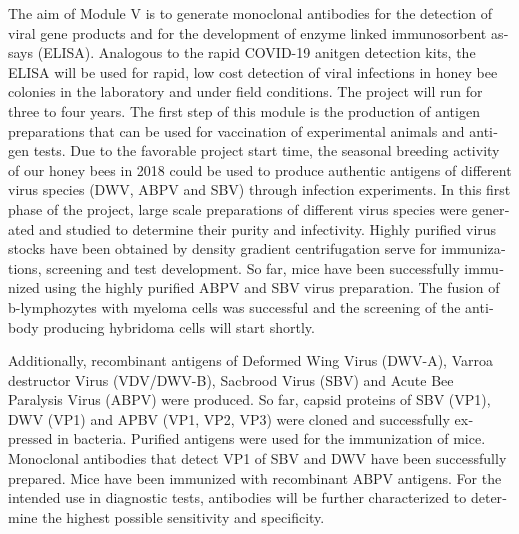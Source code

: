 \begin{otherlanguage}{english}
The aim of Module V is to generate monoclonal antibodies for the detection of viral gene products and for the development of enzyme linked immunosorbent assays (ELISA). Analogous to the rapid COVID-19 anitgen detection kits, the ELISA will be used for rapid, low cost detection of viral infections in honey bee colonies in the laboratory and under field conditions. The project will run for three to four years. The first step of this module is the production of antigen preparations that can be used for vaccination of experimental animals and antigen tests. Due to the favorable project start time, the seasonal breeding activity of our honey bees in 2018 could be used to produce authentic antigens of different virus species (DWV, ABPV and SBV) through infection experiments. In this first phase of the project, large scale preparations of different virus species were generated and studied to determine their purity and infectivity. Highly purified virus stocks have been obtained by density gradient centrifugation serve for immunizations, screening and test development. So far, mice have been successfully immunized using the highly purified ABPV and SBV virus preparation. The fusion of b-lymphozytes with myeloma cells was successful and the screening of the antibody producing hybridoma cells will start shortly.


Additionally, recombinant antigens of Deformed Wing Virus (DWV-A), Varroa destructor Virus (VDV/DWV-B), Sacbrood Virus (SBV) and Acute Bee Paralysis Virus (ABPV) were produced. So far, capsid proteins of SBV (VP1), DWV (VP1) and APBV (VP1, VP2, VP3) were cloned and successfully expressed in bacteria. Purified antigens were used for the immunization of mice. Monoclonal antibodies that detect VP1 of SBV and DWV have been successfully prepared. Mice have been immunized with recombinant ABPV antigens. For the intended use in diagnostic tests, antibodies will be further characterized to determine the highest possible sensitivity and specificity.


\end{otherlanguage}
